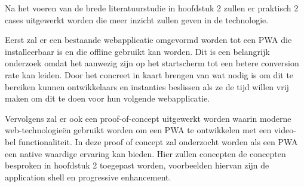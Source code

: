 Na het voeren van de brede literatuurstudie in hoofdstuk 2 zullen er praktisch 2 cases uitgewerkt worden die meer inzicht zullen geven in de technologie.

Eerst zal er een bestaande webapplicatie omgevormd worden tot een PWA die installeerbaar is en die offline gebruikt kan worden. Dit is een belangrijk onderzoek omdat het aanwezig zijn op het startscherm tot een betere conversion rate kan leiden. Door het concreet in kaart brengen van wat nodig is om dit te bereiken kunnen ontwikkelaars en  instanties beslissen als ze de tijd willen vrij maken om dit te doen voor hun volgende webapplicatie.

Vervolgens zal er ook een proof-of-concept uitgewerkt worden waarin moderne web-technologieën gebruikt worden om een PWA te ontwikkelen met een video-bel functionaliteit. In deze proof of concept zal onderzocht worden als een PWA een native waardige ervaring kan bieden. Hier zullen concepten de concepten besproken in hoofdstuk 2 toegepast worden, voorbeelden hiervan zijn de application shell en  progressive enhancement.

